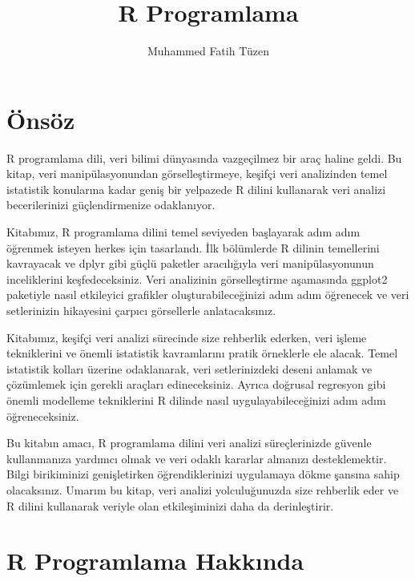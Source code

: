 \documentclass[
  letterpaper,
  DIV=11,
  numbers=noendperiod]{scrreprt}
\title{R Programlama}
\author{Muhammed Fatih Tüzen}
\date{}
\renewcommand*\contentsname{İçindekiler}
\newcommand\contentsname{İçindekiler}
\begin{document}
\maketitle

\renewcommand*\contentsname{İçindekiler}
{
\hypersetup{linkcolor=}
\setcounter{tocdepth}{2}
\tableofcontents
}

\chapter*{Önsöz}\label{uxf6nsuxf6z}


R programlama dili, veri bilimi dünyasında vazgeçilmez bir araç haline
geldi. Bu kitap, veri manipülasyonundan görselleştirmeye, keşifçi veri
analizinden temel istatistik konularına kadar geniş bir yelpazede R
dilini kullanarak veri analizi becerilerinizi güçlendirmenize
odaklanıyor.

Kitabımız, R programlama dilini temel seviyeden başlayarak adım adım
öğrenmek isteyen herkes için tasarlandı. İlk bölümlerde R dilinin
temellerini kavrayacak ve dplyr gibi güçlü paketler aracılığıyla veri
manipülasyonunun inceliklerini keşfedeceksiniz. Veri analizinin
görselleştirme aşamasında ggplot2 paketiyle nasıl etkileyici grafikler
oluşturabileceğinizi adım adım öğrenecek ve veri setlerinizin hikayesini
çarpıcı görsellerle anlatacaksınız.

Kitabımız, keşifçi veri analizi sürecinde size rehberlik ederken, veri
işleme tekniklerini ve önemli istatistik kavramlarını pratik örneklerle
ele alacak. Temel istatistik kolları üzerine odaklanarak, veri
setlerinizdeki deseni anlamak ve çözümlemek için gerekli araçları
edineceksiniz. Ayrıca doğrusal regresyon gibi önemli modelleme
tekniklerini R dilinde nasıl uygulayabileceğinizi adım adım
öğreneceksiniz.

Bu kitabın amacı, R programlama dilini veri analizi süreçlerinizde
güvenle kullanmanıza yardımcı olmak ve veri odaklı kararlar almanızı
desteklemektir. Bilgi birikiminizi genişletirken öğrendiklerinizi
uygulamaya dökme şansına sahip olacaksınız. Umarım bu kitap, veri
analizi yolculuğunuzda size rehberlik eder ve R dilini kullanarak
veriyle olan etkileşiminizi daha da derinleştirir.


\chapter*{R Programlama Hakkında}\label{sec-intro}
\end{document}
